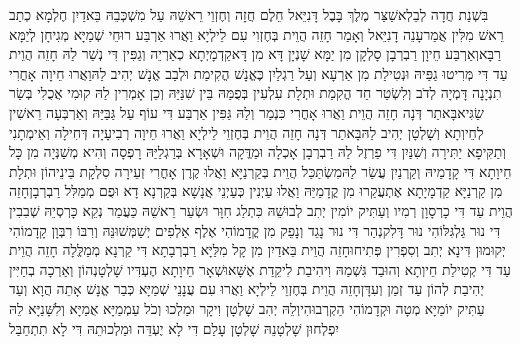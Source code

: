 \documentclass[../main/main.tex]{subfiles}
\begin{document}
\begin{multicols*}{\ncols}
בִּשְׁנַת חֲדָה לְבֵלְאשַׁצַּר מֶלֶךְ בָּבֶל דָּנִיֵּאל חֵלֶם חֲזָה וְחֶזְוֵי רֵאשֵׁהּ עַל מִשְׁכְּבֵהּ בֵּאדַיִן חֶלְמָא כְתַב רֵאשׁ מִלִּין אֲמַר\PreVerseSpace{}עָנֵה דָנִיֵּאל וְאָמַר חָזֵה הֲוֵית בְּחֶזְוִי עִם לֵילְיָא וַאֲרוּ אַרְבַּע רוּחֵי שְׁמַיָּא מְגִיחָן לְיַמָּא רַבָּא\PreVerseSpace{}וְאַרְבַּע חֵיוָן רַבְרְבָן סָלְקָן מִן יַמָּא שָׁנְיָן דָּא מִן דָּא\PreVerseSpace{}קַדְמָיְתָא כְאַרְיֵה וְגַפִּין דִּי נְשַׁר לַהּ חָזֵה הֲוֵית עַד דִּי מְּרִיטוּ גַפַּיהּ וּנְטִילַת מִן אַרְעָא וְעַל רַגְלַיִן כֶּאֱנָשׁ הֳקִימַת וּלְבַב אֱנָשׁ יְהִיב לַהּ\PreVerseSpace{}וַאֲרוּ חֵיוָה אָחֳרִי תִנְיָנָה דָּמְיָה לְדֹב וְלִשְׂטַר חַד הֳקִמַת וּתְלָת עִלְעִין בְּפֻמַּהּ בֵּין שִׁנַּיַּהּ וְכֵן אָמְרִין לַהּ קוּמִי אֲכֻלִי בְּשַׂר שַׂגִּיא\PreVerseSpace{}בָּאתַר דְּנָה חָזֵה הֲוֵית וַאֲרוּ אָחֳרִי כִּנְמַר וְלַהּ גַּפִּין אַרְבַּע דִּי עוֹף עַל גַּבַּיַּהּ וְאַרְבְּעָה רֵאשִׁין לְחֵיוְתָא וְשָׁלְטָן יְהִיב לַהּ\PreVerseSpace{}בָּאתַר דְּנָה חָזֵה הֲוֵית בְּחֶזְוֵי לֵילְיָא וַאֲרוּ חֵיוָה רְבִיעָיָה דְּחִילָה וְאֵימְתָנִי וְתַקִּיפָא יַתִּירָה וְשִׁנַּיִן דִּי פַרְזֶל לַהּ רַבְרְבָן אָכְלָה וּמַדֱּקָה וּשְׁאָרָא בְּרַגְלַיַּהּ רָפְסָה וְהִיא מְשַׁנְּיָה מִן כָּל חֵיוָתָא דִּי קָדָמַיהּ וְקַרְנַיִן עֲשַׂר לַהּ\PreVerseSpace{}מִשְׂתַּכַּל הֲוֵית בְּקַרְנַיָּא וַאֲלוּ קֶרֶן אָחֳרִי זְעֵירָה סִלְקָת בֵּינֵיהוֹן וּתְלָת מִן קַרְנַיָּא קַדְמָיָתָא אֶתְעֲקַרוּ מִן קֳדָמַיַּהּ וַאֲלוּ עַיְנִין כְּעַיְנֵי אֲנָשָׁא בְּקַרְנָא דָא וּפֻם מְמַלִּל רַבְרְבָן\PreVerseSpace{}חָזֵה הֲוֵית עַד דִּי כָרְסָוָן רְמִיו וְעַתִּיק יוֹמִין יְתִב לְבוּשֵׁהּ כִּתְלַג חִוָּר וּשְׂעַר רֵאשֵׁהּ כַּעֲמַר נְקֵא כָּרְסְיֵהּ שְׁבִבִין דִּי נוּר גַּלְגִּלּוֹהִי נוּר דָּלִק\PreVerseSpace{}נְהַר דִּי נוּר נָגֵד וְנָפֵק מִן קֳדָמוֹהִי אֶלֶף אַלְפִים יְשַׁמְּשׁוּנֵּהּ וְרִבּוֹ רִבְּוָן קָדָמוֹהִי יְקוּמוּן דִּינָא יְתִב וְסִפְרִין פְּתִיחוּ\PreVerseSpace{}חָזֵה הֲוֵית בֵּאדַיִן מִן קָל מִלַּיָּא רַבְרְבָתָא דִּי קַרְנָא מְמַלֱּלָה חָזֵה הֲוֵית עַד דִּי קְטִילַת חֵיוְתָא וְהוּבַד גִּשְׁמַהּ וִיהִיבַת לִיקֵדַת אֶשָּׁא\PreVerseSpace{}וּשְׁאָר חֵיוָתָא הֶעְדִּיו שָׁלְטָנְהוֹן וְאַרְכָה בְחַיִּין יְהִיבַת לְהוֹן עַד זְמַן וְעִדָּן\PreVerseSpace{}חָזֵה הֲוֵית בְּחֶזְוֵי לֵילְיָא וַאֲרוּ עִם עֲנָנֵי שְׁמַיָּא כְּבַר אֱנָשׁ אָתֵה הֲוָא וְעַד עַתִּיק יוֹמַיָּא מְטָה וּקְדָמוֹהִי הַקְרְבוּהִי\PreVerseSpace{}וְלֵהּ יְהִב שָׁלְטָן וִיקָר וּמַלְכוּ וְכֹל עַמְמַיָּא אֻמַיָּא וְלִשָּׁנַיָּא לֵהּ יִפְלְחוּן שָׁלְטָנֵהּ שָׁלְטָן עָלַם דִּי לָא יֶעְדֵּה וּמַלְכוּתֵהּ דִּי לָא תִתְחַבַּל\OpenSection{}\par

\end{multicols*}
\end{document}

